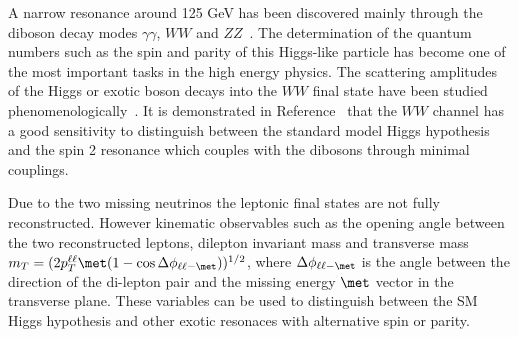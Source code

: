 A narrow resonance around 125 GeV has been discovered mainly through the 
diboson decay modes $\gamma\gamma$, $WW$ and $ZZ$~\cite{discovery-atlas,discovery-cms}. 
The determination of the quantum numbers such as the spin and parity 
of this Higgs-like particle has become one of the most important tasks 
in the high energy physics. 
The scattering amplitudes of the Higgs or exotic boson decays into the 
$WW$ final state have been studied phenomenologically~\cite{Ellis2012,xww}. 
It is demonstrated in Reference~\cite{xww} that the $WW$ channel has 
a good sensitivity to distinguish between the standard model Higgs 
hypothesis and the spin 2 resonance which couples with the 
dibosons through minimal couplings. 

Due to the two missing neutrinos the leptonic final states are not 
fully reconstructed. However kinematic observables such as 
the opening angle between the two reconstructed leptons, dilepton invariant 
mass and transverse mass 
$m_T = ({2p_T^{\ell\ell}\met(1-\cos\Delta\phi_{\ell\ell-\met})})^{1/2}$,
where $\Delta\phi_{\ell\ell-\met}$ is the angle between the direction of 
the di-lepton pair and the missing energy $\met$ vector in the transverse plane. 
These variables can be used to distinguish between the SM Higgs hypothesis and other 
exotic resonaces with alternative spin or parity. 



